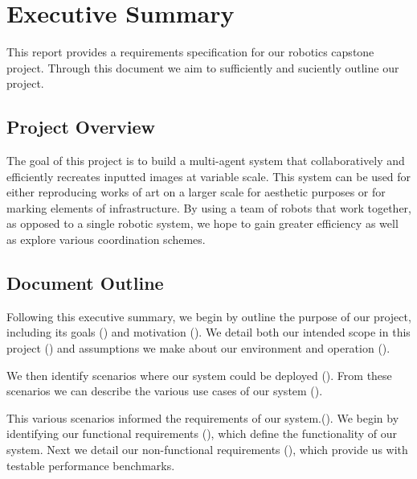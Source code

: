 
\section {Executive Summary}
\label{sec:executive_summary}
This report provides a requirements specification for our robotics capstone project. Through this document we aim to sufficiently and suciently outline our project. 

\subsection{Project Overview}
The goal of this project is to build a multi-agent system that collaboratively and efficiently recreates inputted images at variable scale. 
This system can be used for either reproducing works of art on a larger scale for aesthetic purposes or for marking elements of infrastructure. 
By using a team of robots that work together, as opposed to a single robotic system, we hope to gain greater efficiency as well as explore various coordination schemes. 


\subsection{Document Outline}
Following this executive summary, we begin by outline the purpose of our project, including its goals () and motivation (). 
We detail both our intended scope in this project () and assumptions we make about our environment and operation (). 

We then identify scenarios where our system could be deployed (). 
From these scenarios we can describe the various use cases of our system ().

This various scenarios informed the requirements of our system.(). 
We begin by identifying our functional requirements (), which define the functionality of our system. 
Next we detail our non-functional requirements (), which provide us with testable performance benchmarks.

